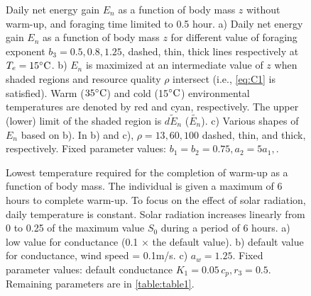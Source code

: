 \begin{figure}[H]
\begin{center}
\caption{
	 Daily net energy gain  $E_n$ as a function of body mass $z$ without warm-up, and foraging time limited to 0.5 hour.
	a) Daily net energy gain  $E_n$ as a function of body mass $z$ for different value of foraging exponent $b_3 = 0.5, 0.8, 1.25$, dashed, thin, thick lines respectively  at $T_e  = 15 ^{\circ} \rm{C}$.
	b) $E_n$ is maximized at an intermediate value of $z$  when shaded regions and resource quality $\rho$ intersect (i.e., \cref{eq:C1} is satisfied).
	Warm ($35^{\circ} \rm{C}$) and cold (15$^{\circ} \rm{C}$) environmental temperatures are denoted by red and cyan, respectively.
	The upper (lower) limit of the shaded region is $\widetilde{dE_n}$ ($\widetilde{E_n}$).  
	c) Various shapes of $E_n$ based on b).
	In b) and c), $\rho = 13, 60, 100$ dashed, thin, and thick, respectively.
	Fixed parameter values: $b_1 = b_2 = 0.75, a_2 = 5 a_1, $.
}
\label{fig3}
\end{center}
\end{figure}
%
\begin{figure}[H]
\begin{center}
\caption{
	Lowest temperature required for the completion of warm-up as a function of body mass.
	The individual is given a maximum of 6 hours to complete warm-up.
	To focus on the effect of solar radiation, daily temperature is constant.
	Solar radiation increases linearly from 0 to 0.25 of the maximum value $S_0$ during a period of 6 hours. 
	a)  low value for conductance (0.1 $\times$ the default value).
	b) default value for conductance, wind speed  = 0.1m/s.
	c)  $a_w = 1.25$. 
	Fixed parameter values: default conductance $K_1 = 0.05 \, c_p, r_3 = 0.5$.
	Remaining parameters are in \cref{table:table1}.
}%
\label{fig4}
\end{center}
\end{figure}
